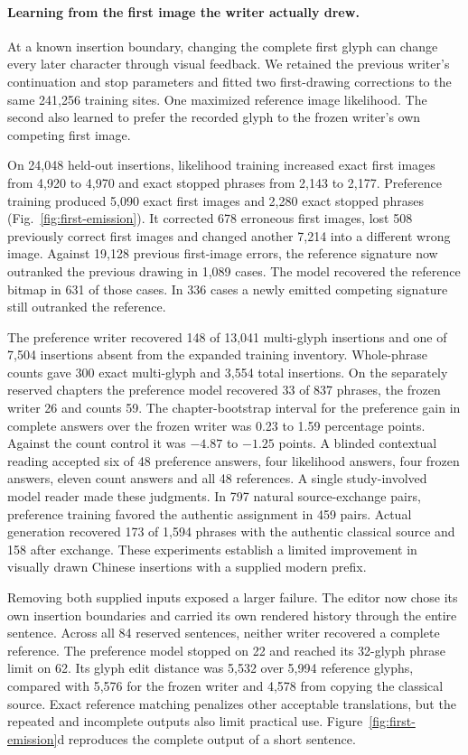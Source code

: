 \paragraph{Learning from the first image the writer actually drew.}
At a known insertion boundary, changing the complete first glyph can change every later character through visual feedback. We retained the previous writer's continuation and stop parameters and fitted two first-drawing corrections to the same 241,256 training sites. One maximized reference image likelihood. The second also learned to prefer the recorded glyph to the frozen writer's own competing first image.

On 24,048 held-out insertions, likelihood training increased exact first images from 4,920 to 4,970 and exact stopped phrases from 2,143 to 2,177. Preference training produced 5,090 exact first images and 2,280 exact stopped phrases (Fig.~\ref{fig:first-emission}). It corrected 678 erroneous first images, lost 508 previously correct first images and changed another 7,214 into a different wrong image. Against 19,128 previous first-image errors, the reference signature now outranked the previous drawing in 1,089 cases. The model recovered the reference bitmap in 631 of those cases. In 336 cases a newly emitted competing signature still outranked the reference.

The preference writer recovered 148 of 13,041 multi-glyph insertions and one of 7,504 insertions absent from the expanded training inventory. Whole-phrase counts gave 300 exact multi-glyph and 3,554 total insertions. On the separately reserved chapters the preference model recovered 33 of 837 phrases, the frozen writer 26 and counts 59. The chapter-bootstrap interval for the preference gain in complete answers over the frozen writer was 0.23 to 1.59 percentage points. Against the count control it was $-4.87$ to $-1.25$ points. A blinded contextual reading accepted six of 48 preference answers, four likelihood answers, four frozen answers, eleven count answers and all 48 references. A single study-involved model reader made these judgments. In 797 natural source-exchange pairs, preference training favored the authentic assignment in 459 pairs. Actual generation recovered 173 of 1,594 phrases with the authentic classical source and 158 after exchange. These experiments establish a limited improvement in visually drawn Chinese insertions with a supplied modern prefix.

Removing both supplied inputs exposed a larger failure. The editor now chose its own insertion boundaries and carried its own rendered history through the entire sentence. Across all 84 reserved sentences, neither writer recovered a complete reference. The preference model stopped on 22 and reached its 32-glyph phrase limit on 62. Its glyph edit distance was 5,532 over 5,994 reference glyphs, compared with 5,576 for the frozen writer and 4,578 from copying the classical source. Exact reference matching penalizes other acceptable translations, but the repeated and incomplete outputs also limit practical use. Figure~\ref{fig:first-emission}d reproduces the complete output of a short sentence.

